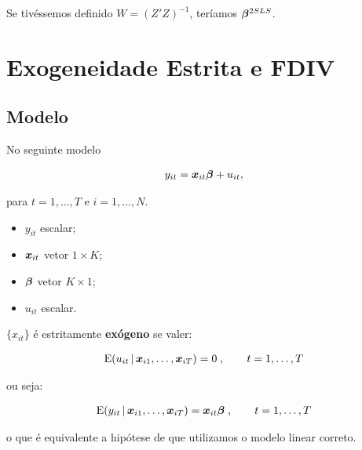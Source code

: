 \documentclass[11pt, oneside, a4paper, article]{article}
\numberwithin{equation}{section}
\begin{document}
\begin{description}
	\noindent
	Se tivéssemos definido $W = (Z'Z)^{-1}$, teríamos $\boldsymbol{\beta}^{2SLS}$.


	\clearpage
	\section{Exogeneidade Estrita e FDIV}


	\subsection{Modelo}

	No seguinte modelo

	\vspace{-1 em}
	\begin{align*} 
		y_{it} = \boldsymbol{x}_{it} \boldsymbol{\beta} + u_{it},
	\end{align*}

	\noindent
	para
	$t = 1, \dots, T$ e $i = 1, \dots, N$.

	\begin{itemize}\itemsep0pt
		\item
			$y_{it}$ escalar;

		\item
			$\boldsymbol{x}_{it}$  vetor $1 \times K$;

		\item
			$\boldsymbol{\beta}$ vetor $K \times 1$;

		\item
			$u_{it}$ escalar.
	\end{itemize}

	\noindent
	$\{x_{it}\}$ é estritamente \textbf{exógeno} se valer:

	\vspace{-1 em}
	\begin{align*}
		\text{E}( u_{it} \, | \, \boldsymbol{x}_{i1}, \dots, \boldsymbol{x}_{iT} ) = 0 \; , \qquad t = 1, \dots, T
	\end{align*}

	\noindent
	ou seja:

	\vspace{-1 em}
	\begin{align*}
		\text{E}( y_{it} \, | \, \boldsymbol{x}_{i1}, \dots, \boldsymbol{x}_{iT} ) = \boldsymbol{x}_{it} \boldsymbol{\beta} 
		\; , \qquad t = 1, \dots, T
	\end{align*}

	\noindent
	o que é equivalente a hipótese de que utilizamos o modelo linear correto.


\end{description}
\end{document}
